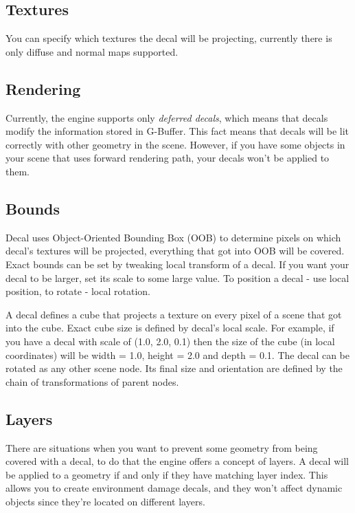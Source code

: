 \documentclass[
]{book}
\theoremstyle{definition}
\theoremstyle{definition}
\theoremstyle{definition}
\theoremstyle{definition}
\theoremstyle{remark}
\begin{document}
\subsection{Textures}\label{textures}

You can specify which textures the decal will be projecting, currently there is only diffuse and normal maps supported.

\subsection{Rendering}\label{rendering-1}

Currently, the engine supports only \emph{deferred decals}, which means that decals modify the information stored in G-Buffer. This fact means that decals will be lit correctly with other geometry in the scene. However, if you have some objects in your scene that uses forward rendering path, your decals won't be applied to them.

\subsection{Bounds}\label{bounds}

Decal uses Object-Oriented Bounding Box (OOB) to determine pixels on which decal's textures will be projected, everything that got into OOB will be covered. Exact bounds can be set by tweaking local transform of a decal. If you want your decal to be larger, set its scale to some large value. To position a decal - use local position, to rotate - local rotation.

A decal defines a cube that projects a texture on every pixel of a scene that got into the cube. Exact cube size is defined by decal's local scale. For example, if you have a decal with scale of (1.0, 2.0, 0.1) then the size of the cube (in local coordinates) will be width = 1.0, height = 2.0 and depth = 0.1. The decal can be rotated as any other scene node. Its final size and orientation are defined by the chain of transformations of parent nodes.

\subsection{Layers}\label{layers-1}

There are situations when you want to prevent some geometry from being covered with a decal, to do that the engine offers a concept of layers. A decal will be applied to a geometry if and only if they have matching layer index. This allows you to create environment damage decals, and they won't affect dynamic objects since they're located on different layers.
\end{document}
